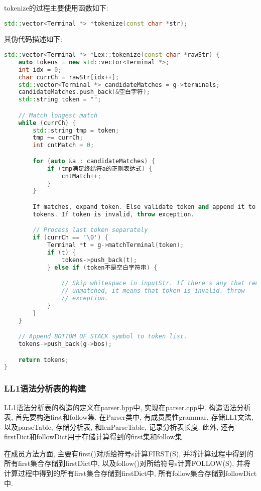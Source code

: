 tokenize的过程主要使用函数如下:
\begin{lstlisting}[language=c++]
std::vector<Terminal *> *tokenize(const char *str);
\end{lstlisting}
其伪代码描述如下:
\begin{lstlisting}[language=c++]
std::vector<Terminal *> *Lex::tokenize(const char *rawStr) {
    auto tokens = new std::vector<Terminal *>;
    int idx = 0;
    char currCh = rawStr[idx++];
    std::vector<Terminal *> candidateMatches = g->terminals;
    candidateMatches.push_back(&空白字符);
    std::string token = "";

    // Match longest match
    while (currCh) {
        std::string tmp = token;
        tmp += currCh;
        int cntMatch = 0;

        for (auto &a : candidateMatches) {
            if (tmp满足终结符a的正则表达式) {
                cntMatch++;
            }
        }

        If matches, expand token. Else validate token and append it to
        tokens. If token is invalid, throw exception.

        // Process last token separately
        if (currCh == '\0') {
            Terminal *t = g->matchTerminal(token);
            if (t) {
                tokens->push_back(t);
            } else if (token不是空白字符串) {

                // Skip whitespace in inputStr. If there's any that remains
                // unmatched, it means that token is invalid. throw
                // exception.
            }
        }
    }

    // Append BOTTOM OF STACK symbol to token list.
    tokens->push_back(g->bos);

    return tokens;
}
\end{lstlisting}

\subsubsection{LL1语法分析表的构建}
LL1语法分析表的构造的定义在parser.hpp中, 实现在parser.cpp中. 构造语法分析表,
首先要构造first和follow集. 在Parser类中, 有成员属性grammar, 存储LL1文法,
以及parseTable, 存储分析表, 和lenParseTable, 记录分析表长度. 此外,
还有firstDict和followDict用于存储计算得到的first集和follow集.\par

在成员方法方面, 主要有first()对所给符号s计算FIRST(S),
并将计算过程中得到的所有first集合存储到firstDict中,
以及follow()对所给符号s计算FOLLOW(S),
并将计算过程中得到的所有first集合存储到firstDict中,
所有follow集合存储到followDict中.\par

